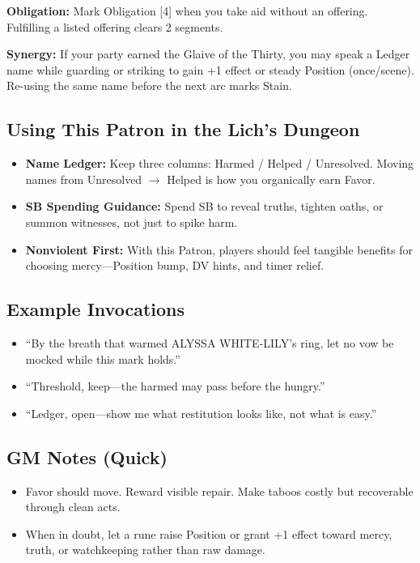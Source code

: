 \documentclass[18pt, letterpaper, twoside]{article}
\newcommand{\obligation}[1]{\noindent\textbf{Obligation:} #1\par}
\newcommand{\synergy}[1]{\noindent\textbf{Synergy:} #1\par}
\begin{document}
\begin{enumerate}
\obligation{Mark Obligation [4] when you take aid without an offering. Fulfilling a listed offering clears 2 segments.}

\synergy{If your party earned the Glaive of the Thirty, you may speak a Ledger name while guarding or striking to gain +1 effect or steady Position (once/scene). Re-using the same name before the next arc marks Stain.}

\subsection{Using This Patron in the Lich's Dungeon}
\begin{itemize}
    \item \textbf{Name Ledger:} Keep three columns: Harmed / Helped / Unresolved. Moving names from Unresolved $\rightarrow$ Helped is how you organically earn Favor.
    \item \textbf{SB Spending Guidance:} Spend SB to reveal truths, tighten oaths, or summon witnesses, not just to spike harm.
    \item \textbf{Nonviolent First:} With this Patron, players should feel tangible benefits for choosing mercy---Position bump, DV hints, and timer relief.
\end{itemize}

\subsection{Example Invocations}
\begin{itemize}
    \item ``By the breath that warmed ALYSSA WHITE-LILY's ring, let no vow be mocked while this mark holds.''
    \item ``Threshold, keep---the harmed may pass before the hungry.''
    \item ``Ledger, open---show me what restitution looks like, not what is easy.''
\end{itemize}

\subsection{GM Notes (Quick)}
\begin{itemize}
    \item Favor should move. Reward visible repair. Make taboos costly but recoverable through clean acts.
    \item When in doubt, let a rune raise Position or grant +1 effect toward mercy, truth, or watchkeeping rather than raw damage.
\end{itemize}


\end{enumerate}
\end{document}
